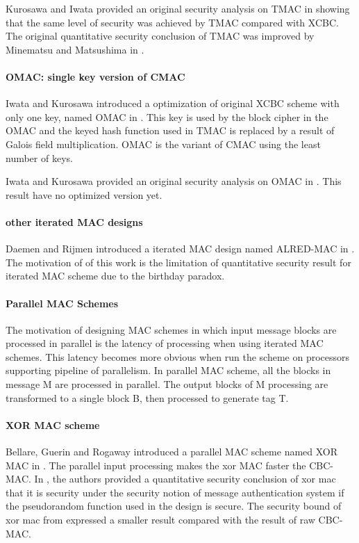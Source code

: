 \documentclass{article}
\begin{document}
Kurosawa and Iwata provided an original security analysis on TMAC in \cite{tmac} showing that the same level of security was achieved by TMAC compared with XCBC. The original quantitative security conclusion of TMAC was improved by Minematsu and Matsushima in \cite{new}. 
\paragraph{OMAC: single key version of CMAC}
Iwata and Kurosawa introduced a optimization of original XCBC scheme with only one key, named OMAC in \cite{omac}. This key is used by the block cipher in the OMAC and the keyed hash function used in TMAC is replaced by a result of Galois field multiplication. OMAC is the variant of CMAC using the least number of keys. 

Iwata and Kurosawa provided an original security analysis on OMAC in \cite{omac}. This result have no optimized version yet.
\paragraph{other iterated MAC designs}
Daemen and Rijmen introduced a iterated MAC design named ALRED-MAC in \cite{alred}. The motivation of of this work is the limitation of quantitative security result for iterated MAC scheme due to the birthday paradox. 

\paragraph{Parallel MAC Schemes}
The motivation of designing MAC schemes in which input message blocks are processed in parallel is the latency of processing when using iterated MAC schemes. This latency becomes more obvious when run the scheme on processors supporting pipeline of parallelism. 
In parallel MAC scheme, all the blocks in message M are processed in parallel. The output blocks of M processing are transformed to a single block B, then processed to generate tag T. 
\paragraph{XOR MAC scheme}
Bellare, Guerin and Rogaway introduced a parallel MAC scheme named XOR MAC in \cite{xor-mac}. 
The parallel input processing makes the xor MAC faster the CBC-MAC. 
In \cite{xor-mac}, the authors provided a quantitative security conclusion of xor mac that it is security under the security notion of message authentication system if the pseudorandom function used in the design is secure. The security bound of xor mac from \cite{xor-mac} expressed a smaller result compared with the result of raw CBC-MAC. 
\end{document}
